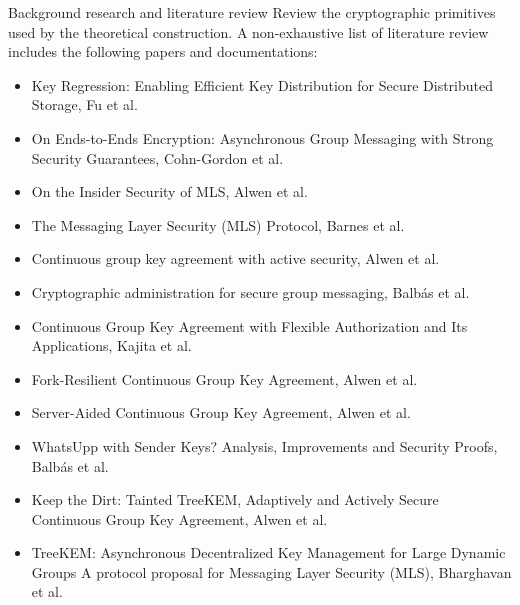 \documentclass[E]{BAMASA}
\begin{document}
\tasks
\begin{workpackage}{Background research and literature review}\label{wp:background}
Review the cryptographic primitives used by the theoretical construction. A non-exhaustive list of literature review includes the following papers and documentations:
\begin{itemize}
	\item Key Regression: Enabling Efficient Key Distribution for Secure Distributed Storage, Fu et al.~\cite{NDSS:FuKamKoh06}
	    
    \item On Ends-to-Ends Encryption: Asynchronous Group Messaging with Strong Security Guarantees, Cohn-Gordon et al.~\cite{CCS:CCGMM18}
    
    \item On the Insider Security of MLS, Alwen et al.~\cite{CCS:AHKM22}
    \item The Messaging Layer Security (MLS) Protocol, Barnes et al.~\cite{rfc9420}
    
    \item Continuous group key agreement with active security, Alwen et al.~\cite{TCC:ACJM20}
    
    \item  Cryptographic administration for secure group messaging, Balb\'as et al.~\cite{USENIX:BalColVau23}
    
    \item Continuous Group Key Agreement with Flexible Authorization and Its Applications, Kajita et al.~\cite{IWSPA:KEONO23}
    
    \item Fork-Resilient Continuous Group Key Agreement, Alwen et al.~\cite{C:AlwMulTse23}
    
    \item Server-Aided Continuous Group Key Agreement, Alwen et al.~\cite{CCS:AHKM22}
    
    \item WhatsUpp with Sender Keys? Analysis, Improvements and Security Proofs, Balb\'as et al.~\cite{AC:BalColGaj23}
    
    \item Keep the Dirt: Tainted TreeKEM, Adaptively and Actively Secure Continuous Group Key Agreement, Alwen et al.~\cite{SP:KPWKCCMYAP21}
    
    \item TreeKEM: Asynchronous Decentralized Key Management for Large Dynamic Groups A protocol proposal for Messaging Layer Security (MLS), Bharghavan et al.~\cite{TreeKEM}
\end{itemize} 


\end{workpackage}
\end{document}

